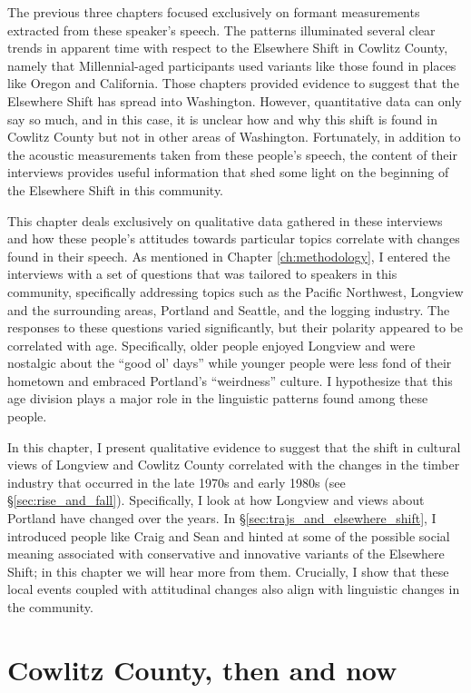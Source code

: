 The previous three chapters focused exclusively on formant measurements extracted from these speaker's speech. The patterns illuminated several clear trends in apparent time with respect to the Elsewhere Shift in Cowlitz County, namely that Millennial-aged participants used variants like those found in places like Oregon and California. Those chapters provided evidence to suggest that the Elsewhere Shift has spread into Washington. However, quantitative data can only say so much, and in this case, it is unclear how and why this shift is found in Cowlitz County but not in other areas of Washington. Fortunately, in addition to the acoustic measurements taken from these people's speech, the content of their interviews provides useful information that shed some light on the beginning of the Elsewhere Shift in this community.

This chapter deals exclusively on qualitative data gathered in these interviews and how these people's attitudes towards particular topics correlate with changes found in their speech. As mentioned in Chapter \ref{ch:methodology}, I entered the interviews with a set of questions that was tailored to speakers in this community, specifically addressing topics such as the Pacific Northwest, Longview and the surrounding areas, Portland and Seattle, and the logging industry. The responses to these questions varied significantly, but their polarity appeared to be correlated with age. Specifically, older people enjoyed Longview and were nostalgic about the ``good ol' days'' while younger people were less fond of their hometown and embraced Portland's ``weirdness'' culture. I hypothesize that this age division plays a major role in the linguistic patterns found among these people.

In this chapter, I present qualitative evidence to suggest that the shift in cultural views of Longview and Cowlitz County correlated with the changes in the timber industry that occurred in the late 1970s and early 1980s (see \S\ref{sec:rise_and_fall}). Specifically, I look at how Longview and views about Portland have changed over the years. In \S \ref{sec:trajs_and_elsewhere_shift}, I introduced people like Craig and Sean and hinted at some of the possible social meaning associated with conservative and innovative variants of the Elsewhere Shift; in this chapter we will hear more from them. Crucially, I show that these local events coupled with attitudinal changes also align with linguistic changes in the community.

\section{Cowlitz County, then and now}
\label{sec:then_and_now}

